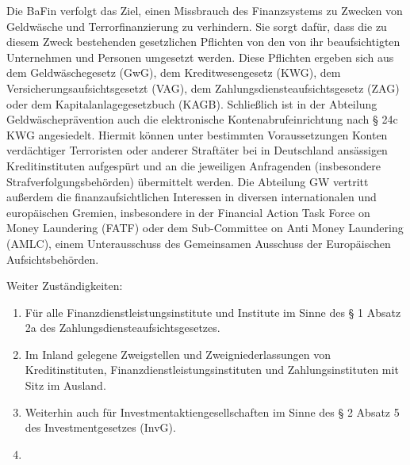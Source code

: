 \documentclass{article}
\begin{document}
\begin{enumerate}
                    Die BaFin verfolgt das Ziel, einen Missbrauch des Finanzsystems zu Zwecken von Geldwäsche und Terrorfinanzierung zu verhindern. Sie sorgt dafür, dass die zu diesem Zweck bestehenden gesetzlichen Pflichten von den von ihr beaufsichtigten Unternehmen und Personen umgesetzt werden. Diese Pflichten ergeben sich aus dem Geldwäschegesetz (GwG), dem Kreditwesengesetz (KWG), dem Versicherungsaufsichtsgesetzt (VAG), dem Zahlungsdiensteaufsichtsgesetz (ZAG) oder dem Kapitalanlagegesetzbuch (KAGB). Schließlich ist in der Abteilung Geldwäscheprävention auch die elektronische Kontenabrufeinrichtung nach § 24c KWG angesiedelt. Hiermit können unter bestimmten Voraussetzungen Konten verdächtiger Terroristen oder anderer Straftäter bei in Deutschland ansässigen Kreditinstituten aufgespürt und an die jeweiligen Anfragenden (insbesondere Strafverfolgungsbehörden) übermittelt werden. Die Abteilung GW vertritt außerdem die finanzaufsichtlichen Interessen in diversen internationalen und europäischen Gremien, insbesondere in der Financial Action Task Force on Money Laundering (FATF) oder dem Sub-Committee on Anti Money Laundering (AMLC), einem Unterausschuss des Gemeinsamen Ausschuss der Europäischen Aufsichtsbehörden.
                   
                    Weiter Zuständigkeiten: 
                    \begin{enumerate}

                        \item

                            Für alle Finanzdienstleistungsinstitute und Institute im Sinne des § 1 Absatz
                            2a des Zahlungsdiensteaufsichtsgesetzes.

                        \item

                            Im Inland gelegene Zweigstellen und Zweigniederlassungen von
                            Kreditinstituten, Finanzdienstleistungsinstituten und
                            Zahlungsinstituten mit Sitz im Ausland.

                        \item

                            Weiterhin auch für Investmentaktiengesellschaften im Sinne des § 2 Absatz 5 des
                            Investmentgesetzes (InvG).

                        \item


\end{enumerate}
\end{enumerate}
\end{document}
